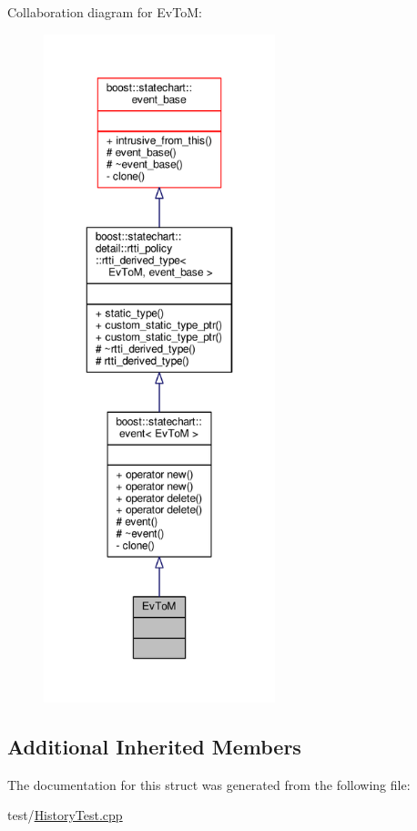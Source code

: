 Collaboration diagram for Ev\+ToM\+:
\nopagebreak
\begin{figure}[H]
\begin{center}
\leavevmode
\includegraphics[height=550pt]{struct_ev_to_m__coll__graph}
\end{center}
\end{figure}
\subsection*{Additional Inherited Members}


The documentation for this struct was generated from the following file\+:\begin{DoxyCompactItemize}
\item 
test/\mbox{\hyperlink{_history_test_8cpp}{History\+Test.\+cpp}}\end{DoxyCompactItemize}
